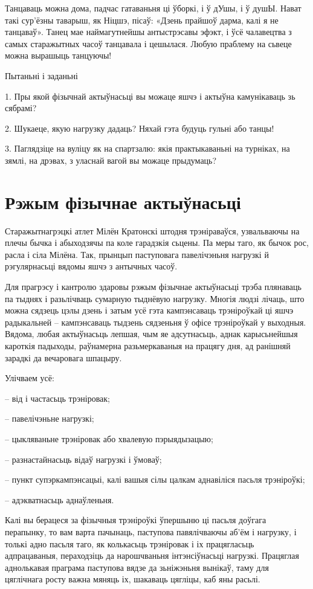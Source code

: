 Танцаваць можна дома, падчас гатаваньня ці ўборкі, і ў дУшы, і ў душЫ. Нават такі сур'ёзны таварыш, як Ніцшэ, пісаў: «Дзень прайшоў дарма, калі я не танцаваў». Танец мае наймагутнейшы антыстрэсавы эфэкт, і ўсё чалавецтва з самых старажытных часоў танцавала і цешылася. Любую праблему на сьвеце можна вырашыць танцуючы!

Пытаньні і заданьні

1. Пры якой фізычнай актыўнасьці вы можаце яшчэ і актыўна камунікаваць зь сябрамі?

2. Шукаеце, якую нагрузку дадаць? Няхай гэта будуць гульні або танцы!

3. Паглядзіце на вуліцу як на спартзалю: якія практыкаваньні на турніках, на зямлі, на дрэвах, з уласнай вагой вы можаце прыдумаць?


\section{Рэжым фізычнае актыўнасьці}

Старажытнагрэцкі атлет Мілён Кратонскі штодня трэніраваўся, узвальваючы на плечы бычка і абыходзячы па коле гарадзкія сьцены. Па меры таго, як бычок рос, расла і сіла Мілёна. Так, прынцып паступовага павелічэньня нагрузкі й рэгулярнасьці вядомы яшчэ з антычных часоў.

Для прагрэсу і кантролю здаровы рэжым фізычнае актыўнасьці трэба плянаваць па тыднях і разьлічваць сумарную тыднёвую нагрузку. Многія людзі лічаць, што можна сядзець цэлы дзень і затым усё гэта кампэнсаваць трэніроўкай ці яшчэ радыкальней – кампэнсаваць тыдзень сядзеньня ў офісе трэніроўкай у выходныя. Вядома, любая актыўнасьць лепшая, чым яе адсутнасьць, аднак карысьнейшыя кароткія падыходы, раўнамерна разьмеркаваныя на працягу дня, ад ранішняй зарадкі да вечаровага шпацыру.

Улічваем усё: 

– від і частасьць трэніровак; 

– павелічэньне нагрузкі; 

– цыкляваньне трэніровак або хвалевую пэрыядызацыю; 

– разнастайнасьць відаў нагрузкі і ўмоваў; 

– пункт супэркампэнсацыі, калі вашыя сілы цалкам аднавіліся пасьля трэніроўкі;

– адэкватнасьць аднаўленьня.

Калі вы берацеся за фізычныя трэніроўкі ўпершыню ці пасьля доўгага перапынку, то вам варта пачынаць, паступова павялічваючы аб'ём і нагрузку, і толькі адно пасьля таго, як колькасьць трэніровак і іх працягласьць адпрацаваныя, пераходзіць да нарошчваньня інтэнсіўнасьці нагрузкі. Працяглая аднолькавая праграма паступова вядзе да зьніжэньня вынікаў, таму для цяглічнага росту важна мяняць іх, шакаваць цягліцы, каб яны расьлі. 

